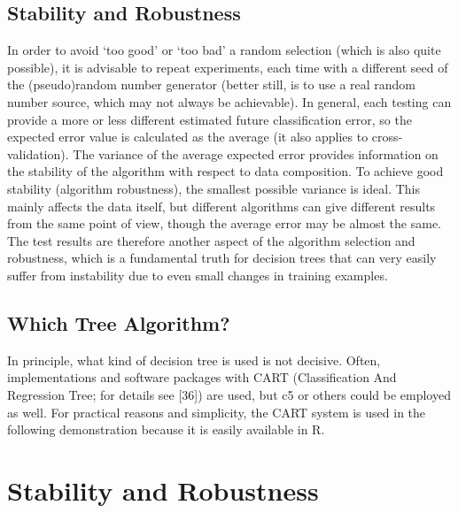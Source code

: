 \documentclass[11pt,openany,executivepaper]{book}
\begin{document}
\subsection{Stability and Robustness}

In order to avoid ‘too good’ or ‘too bad’ a random selection (which is also quite
possible), it is advisable to repeat experiments, each time with a different seed
of the (pseudo)random number generator (better still, is to use a real random
number source, which may not always be achievable).
In general, each testing can provide a more or less different estimated future
classification error, so the expected error value is calculated as the average (it also
applies to cross-validation). The variance of the average expected error provides
information on the stability of the algorithm with respect to data composition.
To achieve good stability (algorithm robustness), the smallest possible variance
is ideal.
This mainly affects the data itself, but different algorithms can give different
results from the same point of view, though the average error may be almost the
same. The test results are therefore another aspect of the algorithm selection and
robustness, which is a fundamental truth for decision trees that can very easily
suffer from instability due to even small changes in training examples.

\subsection{Which Tree Algorithm?}

In principle, what kind of decision tree is used is not decisive. Often, implementations and software packages with CART (Classification And Regression
Tree; for details see [36]) are used, but c5 or others could be employed as well.
For practical reasons and simplicity, the CART system is used in the following
demonstration because it is easily available in R.

\section{Stability and Robustness}
\end{document}
